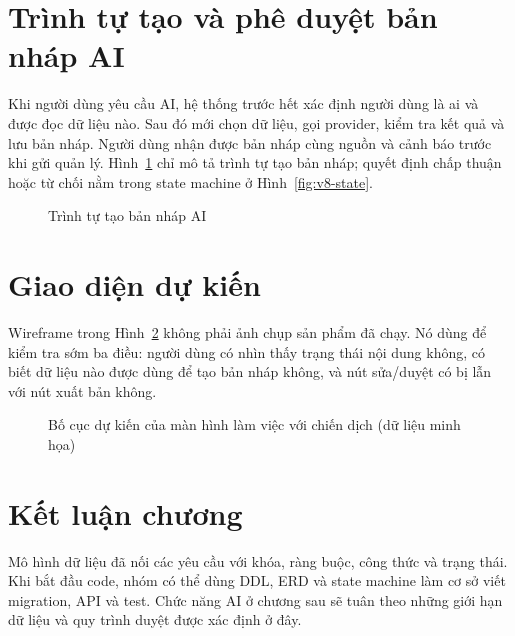 \clearpage
\section{Trình tự tạo và phê duyệt bản nháp AI}

Khi người dùng yêu cầu AI, hệ thống trước hết xác định người dùng là ai và được đọc dữ liệu nào. Sau đó mới chọn dữ liệu, gọi provider, kiểm tra kết quả và lưu bản nháp. Người dùng nhận được bản nháp cùng nguồn và cảnh báo trước khi gửi quản lý. Hình~\ref{fig:v8-sequence} chỉ mô tả trình tự tạo bản nháp; quyết định chấp thuận hoặc từ chối nằm trong state machine ở Hình~\ref{fig:v8-state}.

\begin{figure}[h!]
\centering

\caption{Trình tự tạo bản nháp AI}
\label{fig:v8-sequence}
\end{figure}

\clearpage
\section{Giao diện dự kiến}

Wireframe trong Hình~\ref{fig:v8-wireframe} không phải ảnh chụp sản phẩm đã chạy. Nó dùng để kiểm tra sớm ba điều: người dùng có nhìn thấy trạng thái nội dung không, có biết dữ liệu nào được dùng để tạo bản nháp không, và nút sửa/duyệt có bị lẫn với nút xuất bản không.

\begin{figure}[h!]
\centering

\caption{Bố cục dự kiến của màn hình làm việc với chiến dịch (dữ liệu minh họa)}
\label{fig:v8-wireframe}
\end{figure}

\section{Kết luận chương}

Mô hình dữ liệu đã nối các yêu cầu với khóa, ràng buộc, công thức và trạng thái. Khi bắt đầu code, nhóm có thể dùng DDL, ERD và state machine làm cơ sở viết migration, API và test. Chức năng AI ở chương sau sẽ tuân theo những giới hạn dữ liệu và quy trình duyệt được xác định ở đây.
